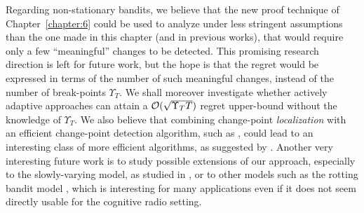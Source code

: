 Regarding non-stationary bandits, we believe that the new proof technique of Chapter~\ref{chapter:6} could be used to analyze \GLRklUCB{} under less stringent assumptions than the one made in this chapter (and in previous works), that would require only a few ``meaningful'' changes to be detected.
This promising research direction is left for future work,  but the hope is that the regret would be expressed in terms of the number of such meaningful changes, instead of the number of break-points $\Upsilon_T$.
We shall moreover investigate whether actively adaptive approaches can attain a $\mathcal{O}(\sqrt{\Upsilon_T T})$ regret upper-bound without the knowledge of $\Upsilon_T$.
We also believe that combining change-point \emph{localization} with an efficient change-point detection algorithm, such as \GLRklUCB, could lead to an interesting class of more efficient algorithms, as suggested by \cite{Maillard2018GLR}.
Another very interesting future work is to study possible extensions of our approach, especially to the slowly-varying model, as studied in \cite{Besbes14stochastic,Louedec16,WeiSrivastava18Abruptly}, or to other models such as the rotting bandit model \cite{Seznec2018}, which is interesting for many applications even if it does not seem directly usable for the cognitive radio setting.


